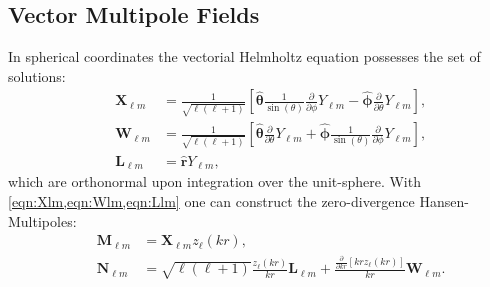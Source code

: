 \documentclass[a4paper,12pt]{scrartcl}  %
\newcommand{\unitv}[1]{\hat{\bm{#1}}}
\begin{document}
\subsection{Vector Multipole Fields}
In spherical coordinates the vectorial Helmholtz equation possesses the set of
solutions:
\begin{align}
&& \mathbf{X}_{\ell m} &= \frac{1}{\sqrt{\ell(\ell+1)}} \left[
\unitv{\theta} \frac{1}{\sin(\theta)} \frac{\partial}{\partial \phi} Y_{\ell m} -
\unitv{\phi} \frac{\partial}{\partial \theta} Y_{\ell m}
\right], \label{eqn:Xlm}\\
&& \mathbf{W}_{\ell m} &= \frac{1}{\sqrt{\ell(\ell+1)}} \left[
\unitv{\theta} \frac{\partial}{\partial \theta} Y_{\ell m} +
\unitv{\phi} \frac{1}{\sin(\theta)} \frac{\partial}{\partial \phi} Y_{\ell m} 
\right], \label{eqn:Wlm}\\
&& \mathbf{L}_{\ell m} &= \unitv{r} Y_{\ell m},\label{eqn:Llm}
\end{align}
which are orthonormal upon integration over the unit-sphere. With \cref{eqn:Xlm,eqn:Wlm,eqn:Llm} one can construct the zero-divergence Hansen-Multipoles:
\begin{align}
&& \mathbf{M}_{\ell m} &= \mathbf{X}_{\ell m} z_\ell(kr), \\
&& \mathbf{N}_{\ell m} &= \sqrt{\ell(\ell+1)} \frac{z_\ell(kr)}{kr} \mathbf{L}_{\ell m}+
\frac{\frac{\partial}{\partial kr}\left[kr z_\ell(kr)\right]}{kr}\mathbf{W}_{\ell m}. \label{eqn:NlmVSH}
\end{align}

\printbibliography
\end{document}
